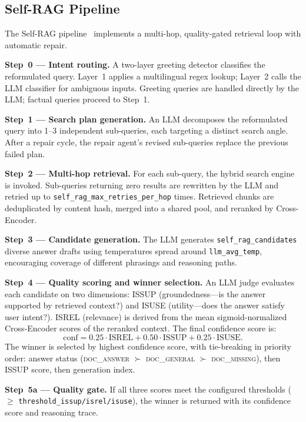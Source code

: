 \documentclass[10pt, conference, a4paper, compsocconf]{IEEEtran}
\begin{document}
\subsection{Self-RAG Pipeline}

The Self-RAG pipeline~\cite{selfrag_asai2023} implements a multi-hop,
quality-gated retrieval loop with automatic repair.

\textbf{Step~0 — Intent routing.} A two-layer greeting detector
classifies the reformulated query. Layer~1 applies a multilingual regex
lookup; Layer~2 calls the LLM classifier for ambiguous inputs. Greeting
queries are handled directly by the LLM; factual queries proceed to Step~1.

\textbf{Step~1 — Search plan generation.} An LLM decomposes the
reformulated query into 1--3 independent sub-queries, each targeting a
distinct search angle. After a repair cycle, the repair agent's revised
sub-queries replace the previous failed plan.

\textbf{Step~2 — Multi-hop retrieval.} For each sub-query, the hybrid
search engine is invoked. Sub-queries returning zero results are rewritten
by the LLM and retried up to \texttt{self\_rag\_max\_retries\_per\_hop}
times. Retrieved chunks are deduplicated by content hash, merged into a
shared pool, and reranked by Cross-Encoder.

\textbf{Step~3 — Candidate generation.} The LLM generates
\texttt{self\_rag\_candidates} diverse answer drafts using temperatures
spread around \texttt{llm\_avg\_temp}, encouraging coverage of different
phrasings and reasoning paths.

\textbf{Step~4 — Quality scoring and winner selection.} An LLM judge
evaluates each candidate on two dimensions: ISSUP (groundedness—is the
answer supported by retrieved context?) and ISUSE (utility—does the
answer satisfy user intent?). ISREL (relevance) is derived from the
mean sigmoid-normalized Cross-Encoder scores of the reranked context.
The final confidence score is:
\begin{equation}
  \text{conf} = 0.25 \cdot \text{ISREL}
              + 0.50 \cdot \text{ISSUP}
              + 0.25 \cdot \text{ISUSE}.
  \label{eq:conf}
\end{equation}
The winner is selected by highest confidence score, with tie-breaking in
priority order: answer status (\textsc{doc\_answer} $\succ$
\textsc{doc\_general} $\succ$ \textsc{doc\_missing}), then ISSUP score,
then generation index.

\textbf{Step~5a — Quality gate.} If all three scores meet the configured
thresholds ($\geq$ \texttt{threshold\_issup/isrel/isuse}), the winner is
returned with its confidence score and reasoning trace.
\end{document}
